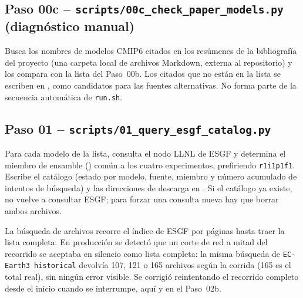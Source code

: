 \subsection{Paso 00c -- \texttt{scripts/00c\_check\_paper\_models.py} (diagnóstico manual)}
Busca los nombres de modelos CMIP6 citados en los resúmenes de la bibliografía del proyecto (una carpeta local de archivos Markdown, externa al repositorio) y los compara con la lista del Paso~00b. Los citados que no están en la lista se escriben en , como candidatos para las fuentes alternativas. No forma parte de la secuencia automática de \texttt{run.sh}.

\subsection{Paso 01 -- \texttt{scripts/01\_query\_esgf\_catalog.py}}
\label{sec:paso01}
Para cada modelo de la lista, consulta el nodo LLNL de ESGF y determina el miembro de ensamble () común a los cuatro experimentos, prefiriendo \texttt{r1i1p1f1}. Escribe el catálogo  (estado por modelo, fuente, miembro y número acumulado de intentos de búsqueda) y las direcciones de descarga en . Si el catálogo ya existe, no vuelve a consultar ESGF; para forzar una consulta nueva hay que borrar ambos archivos.

La búsqueda de archivos recorre el índice de ESGF por páginas hasta traer la lista completa. En producción se detectó que un corte de red a mitad del recorrido se aceptaba en silencio como lista completa: la misma búsqueda de \texttt{EC-Earth3 historical} devolvía 107, 121 o 165 archivos según la corrida (165 es el total real), sin ningún error visible. Se corrigió reintentando el recorrido completo desde el inicio cuando se interrumpe, aquí y en el Paso~02b.

